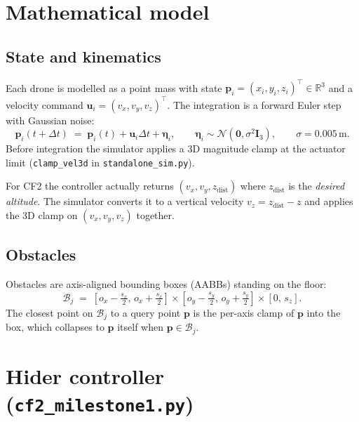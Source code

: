 \documentclass[11pt,a4paper]{article}
\newcommand{\code}[1]{\texttt{#1}}
\newcommand{\vect}[1]{\mathbf{#1}}
\begin{document}
\section{Mathematical model}

\subsection{State and kinematics}

Each drone is modelled as a point mass with state
$\vect{p}_i = (x_i, y_i, z_i)^\top \in \mathbb{R}^3$ and a velocity command
$\vect{u}_i = (v_x, v_y, v_z)^\top$. The integration is a forward Euler step
with Gaussian noise:
\[
    \vect{p}_i(t+\Delta t) \;=\; \vect{p}_i(t) + \vect{u}_i \Delta t + \vect{\eta}_i,
    \qquad
    \vect{\eta}_i \sim \mathcal{N}\!\left(\vect{0}, \sigma^2 \vect{I}_3\right),
    \qquad \sigma = 0.005\,\text{m}.
\]
Before integration the simulator applies a 3D magnitude clamp at the actuator
limit (\code{clamp\_vel3d} in \code{standalone\_sim.py}).

For CF2 the controller actually returns $(v_x, v_y, z_\mathrm{dist})$ where
$z_\mathrm{dist}$ is the \emph{desired altitude}. The simulator converts it to
a vertical velocity $v_z = z_\mathrm{dist} - z$ and applies the 3D clamp on
$(v_x, v_y, v_z)$ together.

\subsection{Obstacles}

Obstacles are axis-aligned bounding boxes (AABBs) standing on the floor:
\[
    \mathcal{B}_j \;=\; [o_x - \tfrac{s_x}{2},\, o_x + \tfrac{s_x}{2}]
                       \times[o_y - \tfrac{s_y}{2},\, o_y + \tfrac{s_y}{2}]
                       \times[0,\, s_z].
\]
The closest point on $\mathcal{B}_j$ to a query point $\vect{p}$ is the per-axis
clamp of $\vect{p}$ into the box, which collapses to $\vect{p}$ itself when
$\vect{p} \in \mathcal{B}_j$.

\section{Hider controller (\code{cf2\_milestone1.py})}
\end{document}
